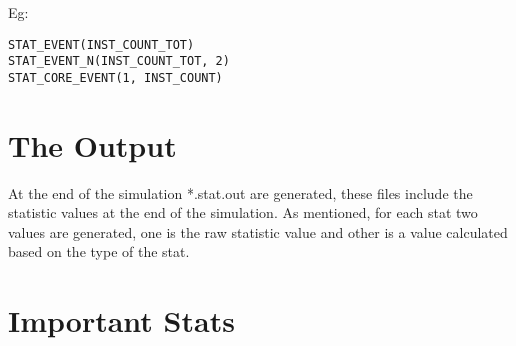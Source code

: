 Eg:
\begin{Verbatim}
STAT_EVENT(INST_COUNT_TOT)
STAT_EVENT_N(INST_COUNT_TOT, 2)
STAT_CORE_EVENT(1, INST_COUNT)
\end{Verbatim}



\section{The Output}

At the end of the simulation *.stat.out are generated, these files include the
statistic values at the end of the simulation. As mentioned, for each stat two
values are generated, one is the raw statistic value and other is a value
calculated based on the type of the stat.



\section{Important Stats}

